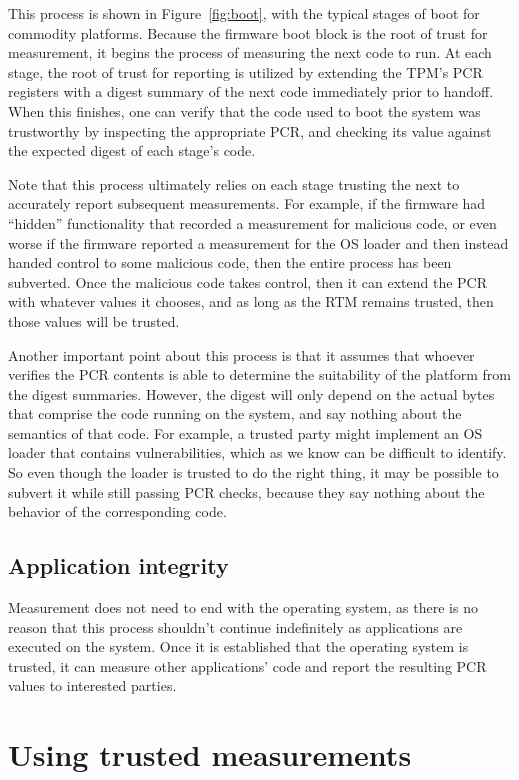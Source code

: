\documentclass[11pt]{article}
\begin{document}
This process is shown in Figure~\ref{fig:boot}, with the typical stages of boot for commodity platforms. Because the firmware boot block is the root of trust for measurement, it begins the process of measuring the next code to run. At each stage, the root of trust for reporting is utilized by extending the TPM's PCR registers with a digest summary of the next code immediately prior to handoff. When this finishes, one can verify that the code used to boot the system was trustworthy by inspecting the appropriate PCR, and checking its value against the expected digest of each stage's code.

Note that this process ultimately relies on each stage trusting the next to accurately report subsequent measurements. For example, if the firmware had ``hidden'' functionality that recorded a measurement for malicious code, or even worse if the firmware reported a measurement for the OS loader and then instead handed control to some malicious code, then the entire process has been subverted. Once the malicious code takes control, then it can extend the PCR with whatever values it chooses, and as long as the RTM remains trusted, then those values will be trusted.

Another important point about this process is that it assumes that whoever verifies the PCR contents is able to determine the suitability of the platform from the digest summaries. However, the digest will only depend on the actual bytes that comprise the code running on the system, and say nothing about the semantics of that code. For example, a trusted party might implement an OS loader that contains vulnerabilities, which as we know can be difficult to identify. So even though the loader is trusted to do the right thing, it may be possible to subvert it while still passing PCR checks, because they say nothing about the behavior of the corresponding code.

\subsection{Application integrity}

Measurement does not need to end with the operating system, as there is no reason that this process shouldn't continue indefinitely as applications are executed on the system. Once it is established that the operating system is trusted, it can measure other applications' code and report the resulting PCR values to interested parties.

\section{Using trusted measurements}
\end{document}
